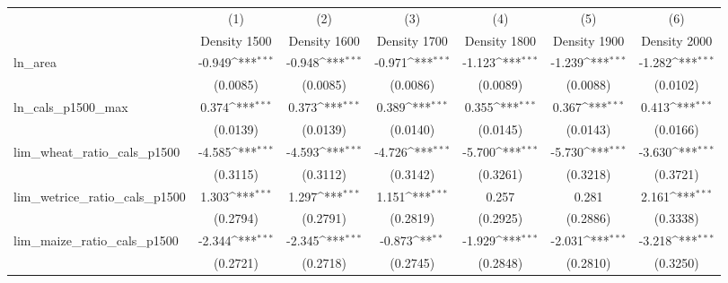 {
\def\sym#1{\ifmmode^{#1}\else\(^{#1}\)\fi}
\begin{tabular}{l*{6}{c}}
\toprule
                    &\multicolumn{1}{c}{(1)}&\multicolumn{1}{c}{(2)}&\multicolumn{1}{c}{(3)}&\multicolumn{1}{c}{(4)}&\multicolumn{1}{c}{(5)}&\multicolumn{1}{c}{(6)}\\
                    &\multicolumn{1}{c}{Density 1500}&\multicolumn{1}{c}{Density 1600}&\multicolumn{1}{c}{Density 1700}&\multicolumn{1}{c}{Density 1800}&\multicolumn{1}{c}{Density 1900}&\multicolumn{1}{c}{Density 2000}\\
\midrule
ln\_area             &      -0.949\sym{***}&      -0.948\sym{***}&      -0.971\sym{***}&      -1.123\sym{***}&      -1.239\sym{***}&      -1.282\sym{***}\\
                    &    (0.0085)         &    (0.0085)         &    (0.0086)         &    (0.0089)         &    (0.0088)         &    (0.0102)         \\
\addlinespace
ln\_cals\_p1500\_max   &       0.374\sym{***}&       0.373\sym{***}&       0.389\sym{***}&       0.355\sym{***}&       0.367\sym{***}&       0.413\sym{***}\\
                    &    (0.0139)         &    (0.0139)         &    (0.0140)         &    (0.0145)         &    (0.0143)         &    (0.0166)         \\
\addlinespace
lim\_wheat\_ratio\_cals\_p1500&      -4.585\sym{***}&      -4.593\sym{***}&      -4.726\sym{***}&      -5.700\sym{***}&      -5.730\sym{***}&      -3.630\sym{***}\\
                    &    (0.3115)         &    (0.3112)         &    (0.3142)         &    (0.3261)         &    (0.3218)         &    (0.3721)         \\
\addlinespace
lim\_wetrice\_ratio\_cals\_p1500&       1.303\sym{***}&       1.297\sym{***}&       1.151\sym{***}&       0.257         &       0.281         &       2.161\sym{***}\\
                    &    (0.2794)         &    (0.2791)         &    (0.2819)         &    (0.2925)         &    (0.2886)         &    (0.3338)         \\
\addlinespace
lim\_maize\_ratio\_cals\_p1500&      -2.344\sym{***}&      -2.345\sym{***}&      -0.873\sym{**} &      -1.929\sym{***}&      -2.031\sym{***}&      -3.218\sym{***}\\
                    &    (0.2721)         &    (0.2718)         &    (0.2745)         &    (0.2848)         &    (0.2810)         &    (0.3250)         \\

\end{tabular}}
